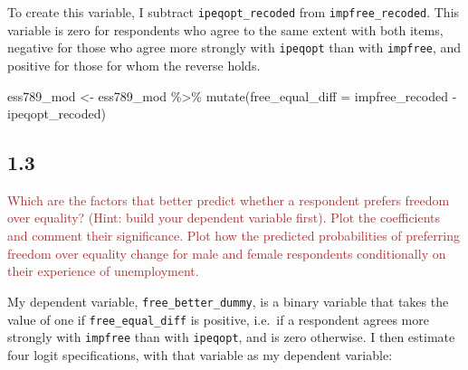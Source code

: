\documentclass[
]{article}
\newenvironment{Shaded}{\begin{snugshade}}{\end{snugshade}}
\newcommand{\AttributeTok}[1]{\textcolor[rgb]{0.77,0.63,0.00}{#1}}
\newcommand{\FunctionTok}[1]{\textcolor[rgb]{0.00,0.00,0.00}{#1}}
\newcommand{\NormalTok}[1]{#1}
\newcommand{\OtherTok}[1]{\textcolor[rgb]{0.56,0.35,0.01}{#1}}
\newcommand{\SpecialCharTok}[1]{\textcolor[rgb]{0.00,0.00,0.00}{#1}}
\begin{document}
To create this variable, I subtract \texttt{ipeqopt\_recoded} from
\texttt{impfree\_recoded}. This variable is zero for respondents who
agree to the same extent with both items, negative for those who agree
more strongly with \texttt{ipeqopt} than with \texttt{impfree}, and
positive for those for whom the reverse holds.

\begin{Shaded}
\begin{Highlighting}[]
\NormalTok{ess789\_mod }\OtherTok{\textless{}{-}}\NormalTok{ ess789\_mod }\SpecialCharTok{\%\textgreater{}\%}
  \FunctionTok{mutate}\NormalTok{(}\AttributeTok{free\_equal\_diff =}\NormalTok{ impfree\_recoded }\SpecialCharTok{{-}}\NormalTok{ ipeqopt\_recoded)}
\end{Highlighting}
\end{Shaded}

\hypertarget{section-2}{%
\subsection{1.3}\label{section-2}}

\textcolor{brown}{Which are the factors that better predict whether a respondent prefers freedom over equality? (Hint: build your dependent variable first). Plot the coefficients and comment their significance. Plot how the predicted probabilities of preferring freedom over equality change for male and female respondents conditionally on their experience of unemployment.}

My dependent variable, \texttt{free\_better\_dummy}, is a binary
variable that takes the value of one if \texttt{free\_equal\_diff} is
positive, i.e.~if a respondent agrees more strongly with
\texttt{impfree} than with \texttt{ipeqopt}, and is zero otherwise. I
then estimate four logit specifications, with that variable as my
dependent variable:
\end{document}
